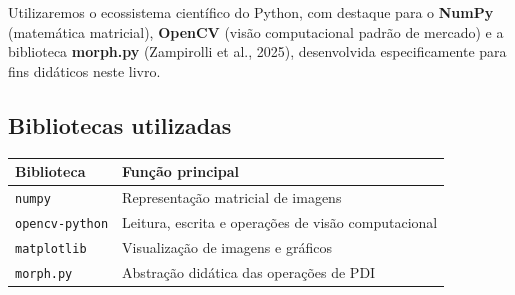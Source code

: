 \documentclass[
  portuguese,
  letterpaper,
  openany,
  oneside,
  12pt,
  a4paper]{book}
\begin{document}
Utilizaremos o ecossistema científico do Python, com destaque para o
\textbf{NumPy} (matemática matricial), \textbf{OpenCV} (visão
computacional padrão de mercado) e a biblioteca \textbf{morph.py}
(Zampirolli et al., 2025), desenvolvida especificamente para fins
didáticos neste livro.

\subsection{\texorpdfstring{ Bibliotecas
utilizadas}{ Bibliotecas utilizadas}}\label{bibliotecas-utilizadas}

\begin{longtable}[]{@{}
  >{\raggedright\arraybackslash}p{}
  >{\raggedright\arraybackslash}p{}@{}}
\toprule\noalign{}
\begin{minipage}[b]{\linewidth}\raggedright
Biblioteca
\end{minipage} & \begin{minipage}[b]{\linewidth}\raggedright
Função principal
\end{minipage} \\
\midrule\noalign{}
\endhead
\bottomrule\noalign{}
\endlastfoot
\texttt{numpy} & Representação matricial de imagens \\
\texttt{opencv-python} & Leitura, escrita e operações de visão
computacional \\
\texttt{matplotlib} & Visualização de imagens e gráficos \\
\texttt{morph.py} & Abstração didática das operações de PDI \\
\end{longtable}
\end{document}
